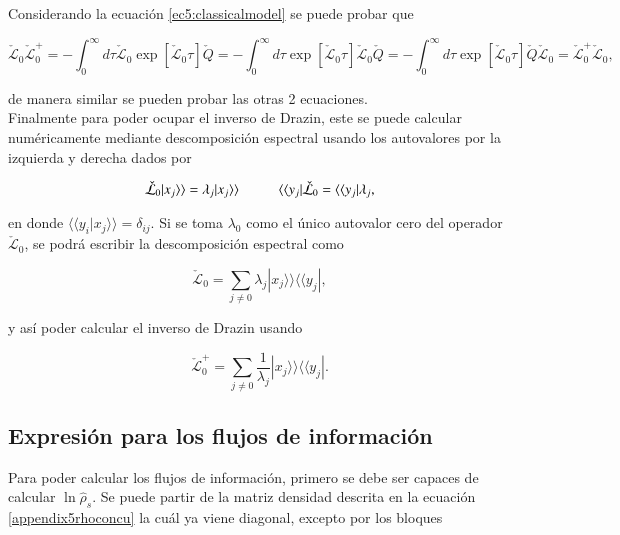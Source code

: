 \begin{appendixs}
Considerando la ecuación \ref{ec5:classicalmodel} se puede probar que 

\begin{equation*}
    \check{\mathcal{L}}_{0}\check{\mathcal{L}}_{0}^{+} = - \int_{0}^{\infty}d\tau \check{\mathcal{L}}_{0}\exp[ \check{\mathcal{L}}_{0}\tau] \check{Q}= - \int_{0}^{\infty}d\tau \exp[ \check{\mathcal{L}}_{0}\tau]\check{\mathcal{L}}_{0} \check{Q} = - \int_{0}^{\infty}d\tau \exp[ \check{\mathcal{L}}_{0}\tau] \check{Q} \check{\mathcal{L}}_{0} = \check{\mathcal{L}}_{0}^{+}\check{\mathcal{L}}_{0},
\end{equation*}

de manera similar se pueden probar las otras 2 ecuaciones.\\
 Finalmente para poder ocupar el inverso de Drazin, este se puede calcular numéricamente mediante descomposición espectral usando los autovalores por la izquierda y derecha dados por 

\begin{equation*}
    \check{\mathcal{L}}_{0}|x_{j}\rangle \rangle = \lambda_{j} |x_{j}\rangle \rangle \hspace{10mm}  \langle \langle y_{j}|\check{\mathcal{L}}_{0} = \langle \langle y_{j}|\lambda_{j},
\end{equation*}

en donde $\langle \langle y_{i}|x_{j}\rangle \rangle = \delta_{ij}$. Si se toma $\lambda_{0}$ como el único autovalor cero del operador $\check{\mathcal{L}}_{0}$, se podrá escribir la descomposición espectral como

\begin{equation*}
    \check{\mathcal{L}}_{0} = \sum_{j\neq 0}\lambda_{j}|x_{j}\rangle \rangle \langle \langle y_{j}|,
\end{equation*}

y así poder calcular el inverso de Drazin usando

\begin{equation*}
    \check{\mathcal{L}}^{+}_{0} = \sum_{j\neq 0}\frac{1}{\lambda_{j}}|x_{j}\rangle \rangle \langle \langle y_{j}|.
\end{equation*}

\label{appendix5drazin}

\subsection{Expresión para los flujos de información}
Para poder calcular los flujos de información, primero se debe ser capaces de calcular $\ln \hat{\rho}_{s}$. Se puede partir de la matriz densidad descrita en la ecuación \ref{appendix5rhoconcu} la cuál ya viene diagonal, excepto por los bloques


\end{appendixs}
